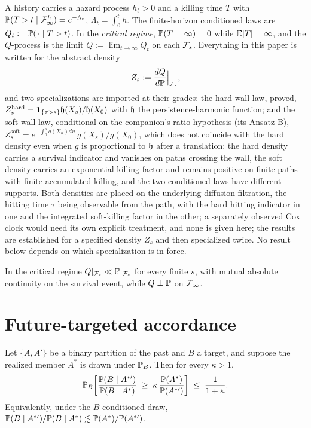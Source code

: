 \begin{definition}
\label{def:model}
A history carries a hazard process $h_t>0$ and a killing time $T$ with
$\mathbb{P}(T>t\mid\mathcal{F}^{h}_\infty)=e^{-\Lambda_t}$, $\Lambda_t=\int_0^th$. The
finite-horizon conditioned laws are $Q_t:=\mathbb{P}(\,\cdot\mid T>t)$. In the
\emph{critical regime}, $\mathbb{P}(T=\infty)=0$ while $\mathbb{E}[T]=\infty$, and the
$Q$-process is the limit $Q:=\lim_{t\to\infty}Q_t$ on each $\mathcal{F}_s$.
Everything in this paper is written for the abstract density
\[
Z_s:=\frac{dQ}{d\mathbb{P}}\Big|_{\mathcal{F}_s},
\]
and two specializations are imported at their grades: the hard-wall
law, proved, $Z^{\mathrm{hard}}_s=\mathbf{1}_{\{\tau>s\}}\mathfrak{h}(X_s)/\mathfrak{h}(X_0)$ with
$\mathfrak{h}$ the persistence-harmonic function; and the soft-wall law,
conditional on the companion's ratio hypothesis (its Ansatz B),
$Z^{\mathrm{soft}}_s=e^{-\int_0^sq(X_u)du}\,g(X_s)/g(X_0)$, which
does not coincide with the hard density even when $g$ is proportional to $\mathfrak{h}$ after a translation: the hard density carries a survival indicator and vanishes on paths crossing the wall, the soft density carries an exponential killing factor and remains positive on finite paths with finite accumulated killing, and the two conditioned laws have different supports. Both densities are placed on the underlying diffusion filtration, the hitting time $\tau$ being observable from the path, with the hard hitting indicator in one and the integrated soft-killing factor in the other; a separately observed Cox clock would need its own explicit treatment, and none is given here; the results are established for a specified density $Z_s$ and then specialized twice. No result below depends on which
specialization is in force.
\end{definition}

\begin{theorem}
\label{thm:singular}
In the critical regime $Q|_{\mathcal{F}_s}\ll\mathbb{P}|_{\mathcal{F}_s}$ for every finite $s$,
with mutual absolute continuity on the survival event, while $Q\perp\mathbb{P}$
on $\mathcal{F}_\infty$.
\end{theorem}

\section{Future-targeted accordance}\label{sec:theorem}

\begin{theorem}\label{thm:accordance}
Let $\{A,A'\}$ be a binary partition of the past and $B$ a target, and
suppose the realized member $A^\ast$ is drawn under $\mathbb{P}_B$. Then for every
$\kappa>1$,
\begin{equation}\label{eq:accordance}
\mathbb{P}_B\!\left[\frac{\mathbb{P}(B\mid A^{\ast\prime})}{\mathbb{P}(B\mid A^\ast)}
\;\ge\;\kappa\,\frac{\mathbb{P}(A^\ast)}{\mathbb{P}(A^{\ast\prime})}\right]
\;\le\;\frac{1}{1+\kappa}.
\end{equation}
Equivalently, under the $B$-conditioned draw,
$\mathbb{P}(B\mid A^{\ast\prime})/\mathbb{P}(B\mid A^\ast)\lesssim\mathbb{P}(A^\ast)/\mathbb{P}(A^{\ast\prime})$.
\end{theorem}

